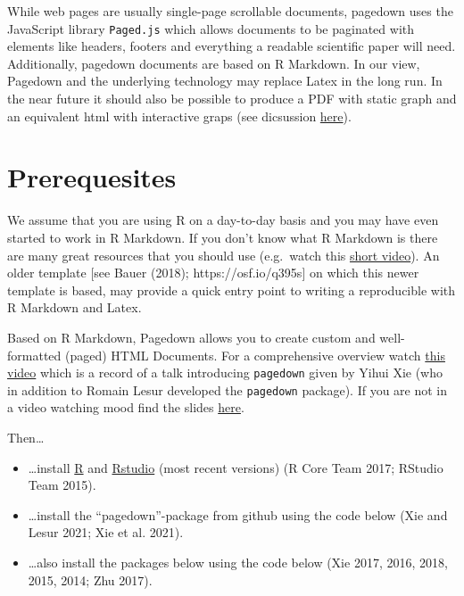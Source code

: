 \documentclass[
  letterpaper,
  DIV=11,
  numbers=noendperiod]{scrartcl}
\providecommand{\tightlist}{%
  \setlength{\itemsep}{0pt}\setlength{\parskip}{0pt}}\usepackage{longtable,booktabs,array}
\begin{document}
While web pages are usually single-page scrollable documents, pagedown
uses the JavaScript library \texttt{Paged.js} which allows documents to
be paginated with elements like headers, footers and everything a
readable scientific paper will need. Additionally, pagedown documents
are based on R Markdown. In our view, Pagedown and the underlying
technology may replace Latex in the long run. In the near future it
should also be possible to produce a PDF with static graph and an
equivalent html with interactive graps (see dicsussion
\href{https://github.com/rstudio/pagedown/pull/87}{here}).

\hypertarget{prerequesites}{%
\section{Prerequesites}\label{prerequesites}}

We assume that you are using R on a day-to-day basis and you may have
even started to work in R Markdown. If you don't know what R Markdown is
there are many great resources that you should use (e.g.~watch this
\href{https://vimeo.com/178485416}{short video}). An older template
{[}see Bauer (2018); https://osf.io/q395s{]} on which this newer
template is based, may provide a quick entry point to writing a
reproducible with R Markdown and Latex.

Based on R Markdown, Pagedown allows you to create custom and
well-formatted (paged) HTML Documents. For a comprehensive overview
watch
\href{https://www.rstudio.com/resources/rstudioconf-2019/pagedown-creating-beautiful-pdfs-with-r-markdown-and-css/}{this
video} which is a record of a talk introducing \texttt{pagedown} given
by Yihui Xie (who in addition to Romain Lesur developed the
\texttt{pagedown} package). If you are not in a video watching mood find
the slides
\href{https://slides.yihui.org/2019-rstudio-conf-pagedown.html\#1}{here}.

Then\ldots{}

\begin{itemize}
\tightlist
\item
  \ldots install \href{https://www.r-project.org/}{R} and
  \href{https://www.rstudio.com/}{Rstudio} (most recent versions) (R
  Core Team 2017; RStudio Team 2015).
\item
  \ldots install the ``pagedown''-package from github using the code
  below (Xie and Lesur 2021; Xie et al. 2021).
\end{itemize}

\begin{itemize}
\tightlist
\item
  \ldots also install the packages below using the code below (Xie 2017,
  2016, 2018, 2015, 2014; Zhu 2017).
\end{itemize}
\end{document}
